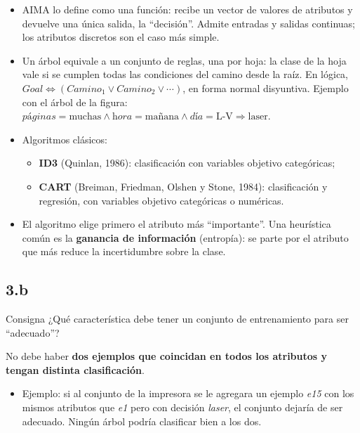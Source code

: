 \documentclass[11pt,a4paper]{article}
\begin{document}
\begin{extras}
\begin{itemize}
  \item AIMA lo define como una función: recibe un vector de valores de atributos y devuelve una única salida, la ``decisión''. Admite entradas y salidas continuas; los atributos discretos son el caso más simple.
  \item Un árbol equivale a un conjunto de reglas, una por hoja: la clase de la hoja vale si se cumplen todas las condiciones del camino desde la raíz. En lógica, $\textit{Goal} \Leftrightarrow (\textit{Camino}_1 \lor \textit{Camino}_2 \lor \cdots)$, en forma normal disyuntiva. Ejemplo con el árbol de la figura: $\textit{páginas}=\text{muchas} \land \textit{hora}=\text{mañana} \land \textit{día}=\text{L-V} \Rightarrow \text{laser}$.
  \item Algoritmos clásicos:
  \begin{itemize}
    \item \textbf{ID3} (Quinlan, 1986): clasificación con variables objetivo categóricas;
    \item \textbf{CART} (Breiman, Friedman, Olshen y Stone, 1984): clasificación y regresión, con variables objetivo categóricas o numéricas.
  \end{itemize}
  \item El algoritmo elige primero el atributo más ``importante''. Una heurística común es la \textbf{ganancia de información} (entropía): se parte por el atributo que más reduce la incertidumbre sobre la clase.
\end{itemize}
\end{extras}

\subsection{3.b}

\begin{enunciado}{Consigna}
¿Qué característica debe tener un conjunto de entrenamiento para ser ``adecuado''?
\end{enunciado}

No debe haber \textbf{dos ejemplos que coincidan en todos los atributos y tengan distinta clasificación}.
\begin{itemize}
  \item Ejemplo: si al conjunto de la impresora se le agregara un ejemplo \textit{e15} con los mismos atributos que \textit{e1} pero con decisión \textit{laser}, el conjunto dejaría de ser adecuado. Ningún árbol podría clasificar bien a los dos.
\end{itemize}
\end{document}
